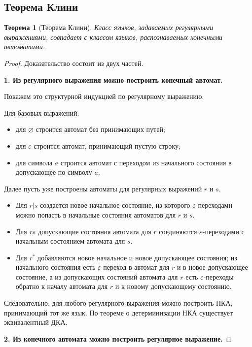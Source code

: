\documentclass[12pt,a4paper]{article}
\newtheorem{theorem}{Теорема}
\begin{document}
\subsection{Теорема Клини}

\begin{theorem}[Теорема Клини]
Класс языков, задаваемых регулярными выражениями, совпадает с классом языков, распознаваемых конечными автоматами.
\end{theorem}

\begin{proof}
Доказательство состоит из двух частей.

\textbf{1. Из регулярного выражения можно построить конечный автомат.}

Покажем это структурной индукцией по регулярному выражению.

Для базовых выражений:
\begin{itemize}
    \item для $\varnothing$ строится автомат без принимающих путей;
    \item для $\varepsilon$ строится автомат, принимающий пустую строку;
    \item для символа $a$ строится автомат с переходом из начального состояния в допускающее по символу $a$.
\end{itemize}

Далее пусть уже построены автоматы для регулярных выражений $r$ и $s$.

\begin{itemize}
    \item Для $r|s$ создается новое начальное состояние, из которого $\varepsilon$-переходами можно попасть в начальные состояния автоматов для $r$ и $s$.
    \item Для $rs$ допускающие состояния автомата для $r$ соединяются $\varepsilon$-переходами с начальным состоянием автомата для $s$.
    \item Для $r^*$ добавляются новое начальное и новое допускающее состояния; из начального состояния есть $\varepsilon$-переход в автомат для $r$ и в новое допускающее состояние, а из допускающих состояний автомата для $r$ есть $\varepsilon$-переходы обратно к началу автомата для $r$ и к новому допускающему состоянию.
\end{itemize}

Следовательно, для любого регулярного выражения можно построить НКА, принимающий тот же язык. По теореме о детерминизации НКА существует эквивалентный ДКА.

\textbf{2. Из конечного автомата можно построить регулярное выражение.}


\end{proof}
\end{document}
